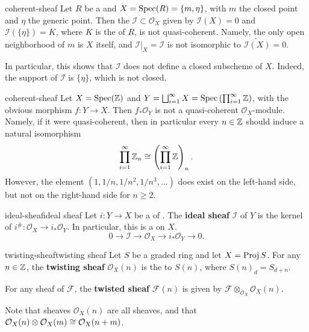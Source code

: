 \begin{example}{coherent-sheaf}
    Let $R$ be a  and $X = \operatorname{Spec}(R) = \{ m, \eta \}$, with $m$ the closed point and $\eta$ the generic point. Then the  $\mathcal{I} \subset \mathcal{O}_X$ given by $\mathcal{I}(X) = 0$ and $\mathcal{I}(\{ \eta \}) = K$, where $K$ is the  of $R$, is not quasi-coherent. Namely, the only open neighborhood of $m$ is $X$ itself, and $\mathcal{I}|_X = \mathcal{I}$ is not isomorphic to $\widetilde{\mathcal{I}(X)} = 0$.
    
    In particular, this shows that $\mathcal{I}$ does not define a closed subscheme of $X$. Indeed, the support of $\mathcal{I}$ is $\{ \eta \}$, which is not closed.
\end{example}

\begin{example}{coherent-sheaf}
    Let $X = \operatorname{Spec}(\mathbb{Z})$ and $Y = \bigsqcup_{i = 1}^{\infty} X = \operatorname{Spec}\left(\prod_{i = 1}^\infty \mathbb{Z} \right)$, with the obvious morphism $f : Y \to X$. Then $f_* \mathcal{O}_Y$ is not a quasi-coherent $\mathcal{O}_X$-module. Namely, if it were quasi-coherent, then in particular every $n \in \mathbb{Z}$ should induce a natural isomorphism
    \[ \prod_{i = 1}^{\infty} \mathbb{Z}_n \cong \left(\prod_{i = 1}^{\infty} \mathbb{Z} \right)_n . \]
    However, the element $(1, 1/n, 1/n^2, 1/n^3, \ldots)$ does exist on the left-hand side, but not on the right-hand side for $n \ge 2$.
\end{example}

\begin{topic}{ideal-sheaf}{ideal sheaf}
    Let $i : Y \to X$ be a  of . The \textbf{ideal sheaf} $\mathcal{I}$ of $Y$ is the kernel of $i^\# : \mathcal{O}_X \to i_* \mathcal{O}_Y$. In particular, this is a  on $X$.
    \[ 0 \to \mathcal{I} \to \mathcal{O}_X \to i_* \mathcal{O}_Y \to 0 . \]
\end{topic}

\begin{topic}{twisting-sheaf}{twisting sheaf}
    Let $S$ be a graded ring and let $X = \operatorname{Proj} S$. For any $n \in \mathbb{Z}$, the \textbf{twisting sheaf} $\mathcal{O}_X(n)$ is the  to $S(n)$, where $S(n)_d = S_{d + n}$.
    
    For any sheaf of  $\mathcal{F}$, the \textbf{twisted sheaf} $\mathcal{F}(n)$ is given by $\mathcal{F} \otimes_{\mathcal{O}_X} \mathcal{O}_X(n)$.
    
    Note that sheaves $\mathcal{O}_X(n)$ are all  sheaves, and that $\mathcal{O}_X(n) \otimes \mathcal{O}_X(m) \cong \mathcal{O}_X(n + m)$.
\end{topic}

